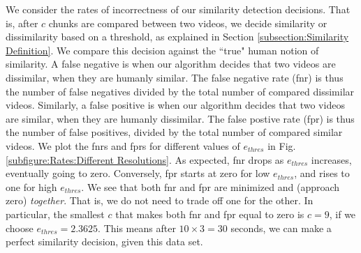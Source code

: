 \documentclass{article}
\begin{document}
We consider the rates of incorrectness of our similarity detection decisions. That is, after $c$ chunks are compared between two videos, we decide similarity or dissimilarity based on a threshold, as explained in Section \ref{subsection:Similarity Definition}. We compare this decision against the ``true" human notion of similarity. A false negative is when our algorithm decides that two videos are dissimilar, when they are humanly similar. The false negative rate (fnr) is thus the number of false negatives divided by the total number of compared dissimilar videos. Similarly, a false positive is when our algorithm decides that two videos are similar, when they are humanly dissimilar. The false postive rate (fpr) is thus the number of false positives, divided by the total number of compared similar videos. We plot the fnrs and fprs for different values of $e_{thres}$ in Fig. \ref{subfigure:Rates:Different Resolutions}. As expected, fnr drops as $e_{thres}$ increases, eventually going to zero. Conversely, fpr starts at zero for low $e_{thres}$, and rises to one for high $e_{thres}$. We see that both fnr and fpr are minimized and (approach zero) \emph{together}. That is, we do not need to trade off one for the other. In particular, the smallest $c$ that makes both fnr and fpr equal to zero is $c = 9$, if we choose $e_{thres} = 2.3625$. This means after $10 \times 3 = 30$ seconds, we can make a perfect similarity decision, given this data set.
\end{document}

